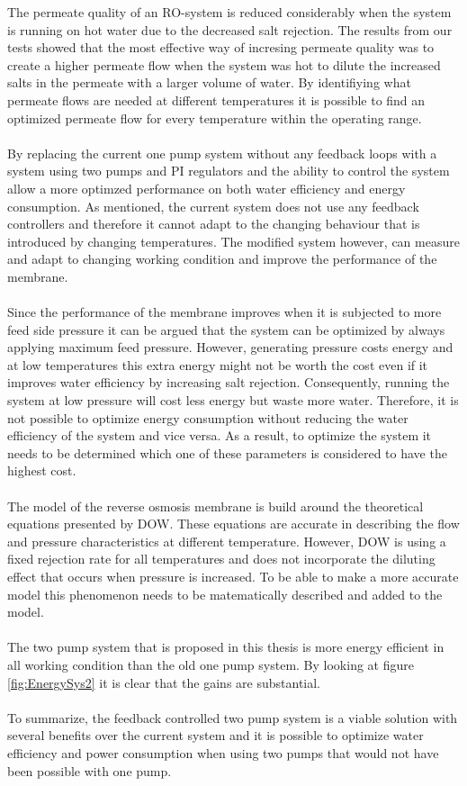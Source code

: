 The permeate quality of an RO-system is reduced considerably when the system is running on hot water due to the decreased salt rejection. The results from our tests showed that the most effective way of incresing permeate quality was to create a higher permeate flow when the system was hot to dilute the increased salts in the permeate with a larger volume of water. By identifiying what permeate flows are needed at different temperatures it is possible to find an optimized permeate flow for every temperature within the operating range.\\
 \\
By replacing the current one pump system without any feedback loops with a system using two pumps and PI regulators and the ability to control the system allow a more optimzed performance on both water efficiency and energy consumption. As mentioned, the current system does not use any feedback controllers and therefore it cannot adapt to the changing behaviour that is introduced by changing temperatures. The modified system however, can measure and adapt to changing working condition and improve the performance of the membrane. \\
 \\
Since the performance of the membrane improves when it is subjected to more feed side pressure it can be argued that the system can be optimized by always applying maximum feed pressure. However, generating pressure costs energy and at low temperatures this extra energy might not be worth the cost even if it improves water efficiency by increasing salt rejection. Consequently, running the system at low pressure will cost less energy but waste more water. Therefore, it is not possible to optimize energy consumption without reducing the water efficiency of the system and vice versa. As a result, to optimize the system it needs to be determined which one of these parameters is considered to have the highest cost. \\
 \\
The model of the reverse osmosis membrane is build around the theoretical equations presented by DOW. These equations are accurate in describing the flow and pressure characteristics at different temperature. However, DOW is using a fixed rejection rate for all temperatures and does not incorporate the diluting effect that occurs when pressure is increased.  To be able to make a more accurate model this phenomenon needs to be matematically described and added to the model. \\
 \\
 The two pump system that is proposed in this thesis is more energy efficient in all working condition than the old one pump system. By looking at figure \ref{fig:EnergySys2} it is clear that the gains are substantial. \\
  \\
To summarize, the feedback controlled two pump system is a viable solution with several benefits over the current system and it is possible to optimize water efficiency and power consumption when using two pumps that would not have been possible with one pump. 